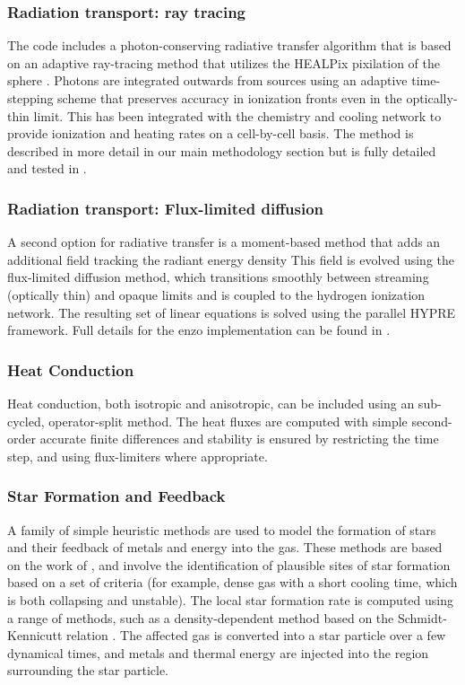 \subsubsection{Radiation transport: ray tracing}

The code includes a photon-conserving radiative transfer algorithm
that is based on an adaptive ray-tracing method that utilizes the
HEALPix pixilation of the sphere \citep{AbelWandelt02}.  Photons are
integrated outwards from sources using an adaptive time-stepping
scheme that preserves accuracy in ionization fronts even in the
optically-thin limit.  This has been integrated with the chemistry and
cooling network to provide ionization and heating rates on a
cell-by-cell basis.  The method is described in more detail in our
main methodology section but is fully detailed and tested in
\citet{Wise11_Moray}.

\subsubsection{Radiation transport: Flux-limited diffusion}

A second option for radiative transfer is a moment-based method that
adds an additional field tracking the radiant energy density
This field is evolved using the flux-limited diffusion method, which
transitions smoothly between streaming (optically thin) and opaque
limits and is coupled to the hydrogen ionization network.  The
resulting set of linear equations is solved using the parallel HYPRE
framework.  Full details for the enzo implementation can be found in
\citet{ReynoldsHayesPaschosNorman2009}.

\subsubsection{Heat Conduction}

Heat conduction, both isotropic and anisotropic, can be included using
an sub-cycled, operator-split method.  The heat fluxes are computed
with simple second-order accurate finite differences and stability is
ensured by restricting the time step, and using flux-limiters where
appropriate.

\subsubsection{Star Formation and Feedback}

A family of simple heuristic methods are used to model the formation
of stars and their feedback of metals and energy into the gas.  These
methods are based on the work of \citet{CO1992}, and involve the
identification of plausible sites of star formation based on a set of
criteria (for example, dense gas with a short cooling time, which is
both collapsing and unstable).  The local star formation rate is
computed using a range of methods, such as a density-dependent method
based on the Schmidt-Kennicutt relation \citep{K89}.  The affected gas
is converted into a star particle over a few dynamical times, and
metals and thermal energy are injected into the region surrounding the
star particle.


